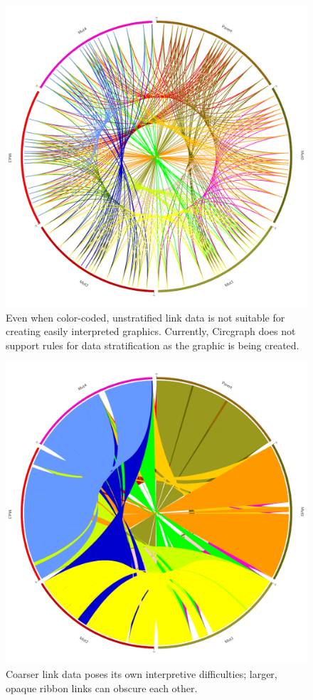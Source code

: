 \documentclass{article}
\begin{document}
\begin{figure}[H]
\centering
\includegraphics[scale=0.1]{./Generated_Data_Non_Ribbon.png}
\caption{Even when color-coded, unstratified link data is not suitable for creating easily interpreted graphics. Currently, Circgraph does not support rules for data stratification as the graphic is being created.}
\end{figure}

\begin{figure}[H]
\centering
\includegraphics[scale=0.1]{./Generated_Color_Fixes.png}
\caption{Coarser link data poses its own interpretive difficulties; larger, opaque ribbon links can obscure each other.}
\end{figure}
\end{document}
